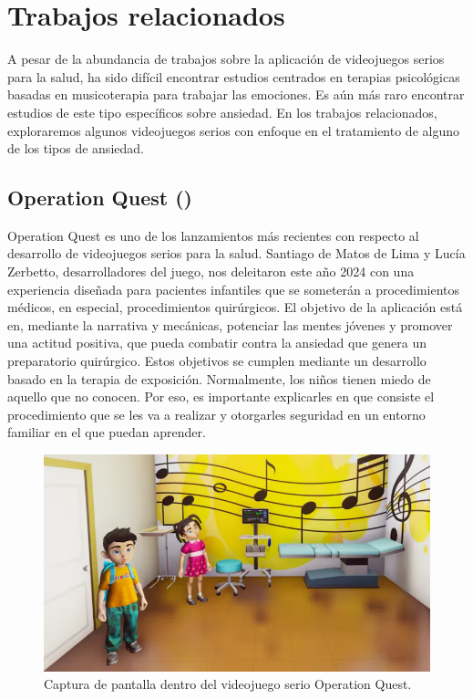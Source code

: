 \section{Trabajos relacionados}

A pesar de la abundancia de trabajos sobre la aplicación de videojuegos serios para la salud, ha sido difícil encontrar estudios centrados en terapias psicológicas basadas en musicoterapia para trabajar las emociones. Es aún más raro encontrar estudios de este tipo específicos sobre ansiedad. En los trabajos relacionados, exploraremos algunos videojuegos serios con enfoque en el tratamiento de alguno de los tipos de ansiedad.

\subsection{Operation Quest (\cite{OPERATIONQUEST:2024})}

Operation Quest es uno de los lanzamientos más recientes con respecto al desarrollo de videojuegos serios para la salud. Santiago de Matos de Lima y Lucía Zerbetto, desarrolladores del juego, nos deleitaron este año 2024 con una experiencia diseñada para pacientes infantiles que se someterán a procedimientos médicos, en especial, procedimientos quirúrgicos. El objetivo de la aplicación está en, mediante la narrativa y mecánicas, potenciar las mentes jóvenes y promover una actitud positiva, que pueda combatir contra la ansiedad que genera un preparatorio quirúrgico. Estos objetivos se cumplen mediante un desarrollo basado en la terapia de exposición. Normalmente, los niños tienen miedo de aquello que no conocen. Por eso, es importante explicarles en que consiste el procedimiento que se les va a realizar y otorgarles seguridad en un entorno familiar en el que puedan aprender.

\begin{figure}[h!]
	\centering
	\includegraphics[width=0.55\linewidth]{Figuras/Estado/OperationQuest1.png}
	\caption{Captura de pantalla dentro del videojuego serio Operation Quest.}
	\label{fig:OperationQuest1}
	\vspace{-30pt}
\end{figure}


